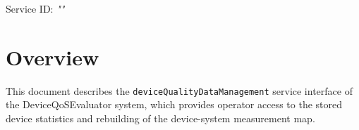 \documentclass[a4paper]{arrowhead}
\begin{document}
\sloppy

\ArrowheadSetup

\begin{center}
  \vspace*{1cm}
  \huge{\arrowtitle}

  \vspace*{0.2cm}
  \LARGE{\arrowtype}
  \vspace*{1cm}

  \Large{Service ID: \textit{"\arrowid"}}

  \vspace*{\fill}


  \vspace*{1cm}
  \vspace*{\fill}

  \begin{abstract}
    This document describes the HTTP/1.1 protocol with TLS payload security and JSON payload encoding variant of the \texttt{device\allowbreak{}Quality\allowbreak{}Data\allowbreak{}Management} service of the DeviceQoSEvaluator system.
  \end{abstract}

  \vspace*{1cm}
\end{center}

\newpage

\tableofcontents
\newpage

\section{Overview}
\label{sec:overview}

This document describes the \texttt{device\allowbreak{}Quality\allowbreak{}Data\allowbreak{}Management} service interface of the DeviceQoSEvaluator system, which provides operator access to the stored device statistics and rebuilding of the device-system measurement map.
\end{document}
